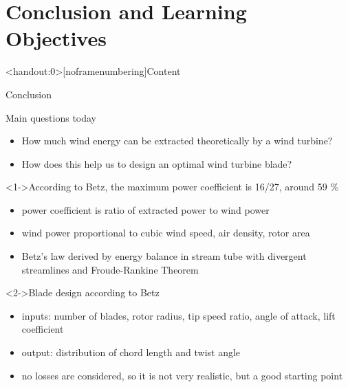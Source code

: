 \section[Conclusion]{Conclusion and Learning Objectives}\label{sec:CNO}
\miniframesoff	
\begin{frame}<handout:0>[noframenumbering]{Content}
\tableofcontents[currentsection]
\end{frame}
\miniframeson
\begin{frame}{Conclusion}  	
	\begin{alertblock}{Main questions today}
		\begin{itemize}
			\item How much wind energy can be extracted theoretically by a wind turbine?
			\item How does this help us to design an optimal wind turbine blade?	
		\end{itemize}
	\end{alertblock}		
	\begin{block}<1->{According to Betz, the maximum power coefficient is 16/27, around 59 \%}
  		\begin{itemize}
  			\item power coefficient is ratio of extracted power to wind power 
    		\item wind power proportional to cubic wind speed, air density, rotor area 
    		\item Betz's law derived by energy balance in stream tube with divergent streamlines and Froude-Rankine Theorem    		
		\end{itemize}
	\end{block}	
	  	\begin{block}{Blade design according to Betz}
	  		\begin{itemize}
	    		\item inputs: number of blades, rotor radius, tip speed ratio, angle of attack, lift coefficient
	    		\item output: distribution of chord length and twist angle
	  			\item no losses are considered, so it is not very realistic, but a good starting point	    		
			\end{itemize}
		\end{block}			
\end{frame}
